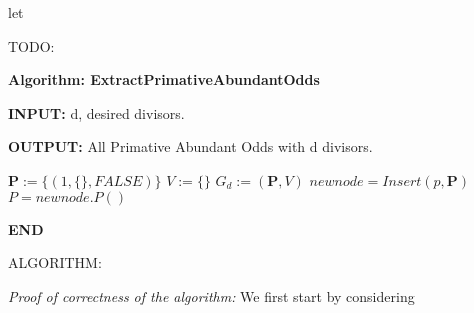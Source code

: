 \documentclass[../paper.tex]{subfiles}
\begin{document}
let 

\begin {algorithmic}
\STATE TODO: 

\end {algorithmic}

{\setlength{\parindent}{0cm}

\textbf{Algorithm: ExtractPrimativeAbundantOdds}

\textbf{INPUT:} d, desired divisors.

\textbf{OUTPUT:} All Primative Abundant Odds with d divisors.

}

\begin{algorithmic}

\STATE $\mathbf{P} := \{(1, \{\}, FALSE)\}$
\STATE $V := \{\}$
\STATE $G_d := (\mathbf{P},V)$
	\STATE $newnode = Insert(p,\mathbf{P})$ 
	\STATE $P = newnode.P()$
	\STATE


			\STATE
		\ENDIF
	\ENDIF
		\IF {}
			\STATE 
		\ENDIF
	\ELSE
		\STATE
	\ENDIF

\ENDWHILE
%
\end{algorithmic}

\textbf{END}


ALGORITHM:



\textit{Proof of correctness of the algorithm:}
We first start by considering 
\end{document}
